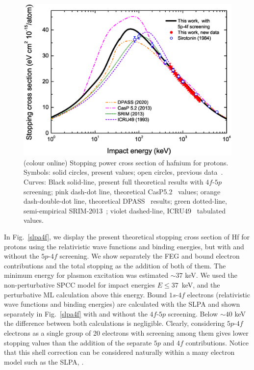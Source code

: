 \documentclass[aps,pra,reprint,superscriptaddress]{revtex4-1}
\begin{document}
\begin{figure}[!t]
\centering
\includegraphics[width=13.0cm]{Fig03_new2.eps}
\caption{(colour online) Stopping power cross section of hafnium for protons. Symbols: 
solid circles, present values; open circles, previous data~\cite{Sirotinin}. 
Curves: Black solid-line, present full theoretical results with 
$4f$-$5p$ screening; pink dash-dot line, theoretical 
CasP5.2~\cite{Grande,casp52} values; orange dash-double-dot line, 
theoretical DPASS~\cite{DPASS20} results; green dotted-line, 
semi-empirical SRIM-2013~\cite{Ziegler01}; violet dashed-line, 
ICRU49~\cite{ICRU49} tabulated values.}
\label{F03}
\end{figure}

In Fig.~\ref{slpa4f}, we display the present theoretical stopping cross
section of Hf for protons using the relativistic wave functions and
 binding energies, but with and without the $5p$-$4f$ screening. 
We show separately the FEG and bound electron contributions and the 
total stopping as the addition of both of them.
The minimum energy for plasmon excitation was estimated $\sim 37$ keV. We
used the non-perturbative SPCC model for impact energies $E \leq 37$~keV, 
and the perturbative ML calculation above this energy. Bound $1s$-$4f$ 
electrons (relativistic wave functions and binding energies) are 
calculated with the SLPA and shown separately in Fig.~\ref{slpa4f} 
with and without the $4f$-$5p$ screening. Below $\sim 40$ keV the 
difference between both calculations is negligible. Clearly, 
considering $5p$-$4f$ electrons as a single group of 20 electrons with 
screening among them gives lower stopping values than the addition of 
the separate $5p$ and $4f$ contributions. Notice that this shell 
correction can be considered naturally within a many electron model 
such as the SLPA, .
\end{document}
